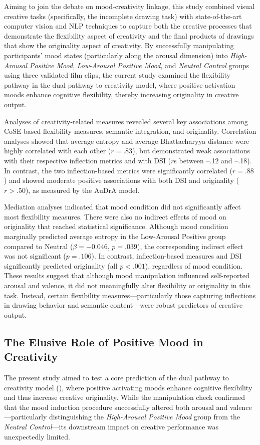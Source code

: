 \documentclass[../MA_Thesis.tex]{subfiles}
\begin{document}
Aiming to join the debate on mood-creativity linkage, this study combined visual creative tasks (specifically, the incomplete drawing task) with state-of-the-art computer vision and NLP techniques to capture both the creative processes that demonstrate the flexibility aspect of creativity and the final products of drawings that show the originality aspect of creativity. By successfully manipulating participants’ mood states (particularly along the arousal dimension) into \textit{High-Arousal Positive Mood}, \textit{Low-Arousal Positive Mood}, and \textit{Neutral Control} groups using three validated film clips, the current study examined the flexibility pathway in the dual pathway to creativity model, where positive activation moods enhance cognitive flexibility, thereby increasing originality in creative output.

Analyses of creativity-related measures revealed several key associations among CoSE-based flexibility measures, semantic integration, and originality. Correlation analyses showed that average entropy and average Bhattacharyya distance were highly correlated with each other ($r = .83$), but demonstrated weak associations with their respective inflection metrics and with DSI ($r$s between –.12 and –.18). In contrast, the two inflection-based metrics were significantly correlated ($r = .88$) and showed moderate positive associations with both DSI and originality ($r > .50$), as measured by the AuDrA model.

Mediation analyses indicated that mood condition did not significantly affect most flexibility measures. There were also no indirect effects of mood on originality that reached statistical significance. Although mood condition marginally predicted average entropy in the Low-Arousal Positive group compared to Neutral ($\beta = -0.046$, $p = .039$), the corresponding indirect effect was not significant ($p = .106$). In contrast, inflection-based measures and DSI significantly predicted originality (all $p < .001$), regardless of mood condition. These results suggest that although mood manipulation influenced self-reported arousal and valence, it did not meaningfully alter flexibility or originality in this task. Instead, certain flexibility measures—particularly those capturing inflections in drawing behavior and semantic content—were robust predictors of creative output.

\subsection*{The Elusive Role of Positive Mood in Creativity}
The present study aimed to test a core prediction of the dual pathway to creativity model (\cite{nijstad_dual_2010}), where positive activating moods enhance cognitive flexibility and thus increase creative originality. While the manipulation check confirmed that the mood induction procedure successfully altered both arousal and valence—particularly distinguishing the \textit{High-Arousal Positive Mood} group from the \textit{Neutral Control}—its downstream impact on creative performance was unexpectedly limited.
\end{document}
